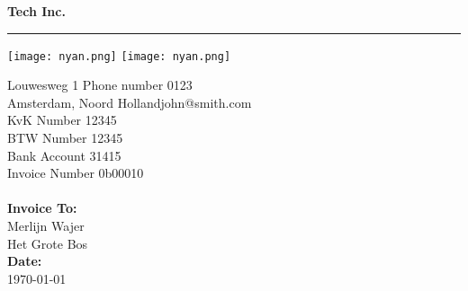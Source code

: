 \documentclass{invoice} %
\def \tab {\hspace*{3ex}} %
\begin{document}

\hfil{\Huge\bf Tech Inc.}\hfil %
\bigskip\break %
\hrule %

\vspace{-8em}
\texttt{[image: nyan.png]}
\hspace{23em}
\texttt{[image: nyan.png]}
\hspace{-23em}
\vspace{8em}

Louwesweg 1 \hfill Phone number 0123 \\
Amsterdam, Noord Holland\hfill john@smith.com \\
KvK Number \hfill 12345 \\
BTW Number \hfill 12345 \\
Bank Account \hfill 31415 \\
Invoice Number \hfill 0b00010
\\ \\
{\bf Invoice To:} \\
\tab Merlijn Wajer \\ %
\tab Het Grote Bos \\ %

{\bf Date:} \\
\tab \today \\

\begin{invoiceTable}



\end{invoiceTable}

\end{document}
